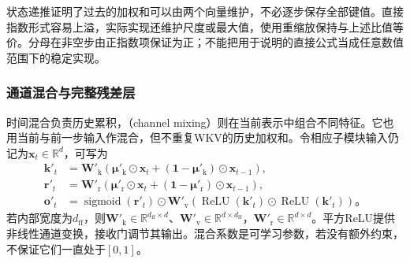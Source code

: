 状态递推证明了过去的加权和可以由两个向量维护，不必逐步保存全部键值。直接指数形式容易上溢，实际实现还维护尺度或最大值，使用重缩放保持与上述比值等价。分母在非空步由正指数项保证为正；不能把用于说明的直接公式当成任意数值范围下的稳定实现。

\subsubsection{通道混合与完整残差层}
\label{sec:rnn-rwkv-architecture}

时间混合负责历史累积，（channel mixing）则在当前表示中组合不同特征。它也用当前与前一步输入作混合，但不重复WKV的历史加权和。令相应子模块输入仍记为$\bm x_t\in\mathbb R^d$，可写为
\begin{equation}
  \begin{aligned}
    \bm k'_t&=\bm W'_{\mathrm k}\left(\bm\mu'_{\mathrm k}\odot\bm x_t
          +(\bm1-\bm\mu'_{\mathrm k})\odot\bm x_{t-1}\right),\\
    \bm r'_t&=\bm W'_{\mathrm r}\left(\bm\mu'_{\mathrm r}\odot\bm x_t
          +(\bm1-\bm\mu'_{\mathrm r})\odot\bm x_{t-1}\right),\\
    \bm o'_t&=\operatorname{sigmoid}(\bm r'_t)\odot
         \bm W'_{\mathrm v}\left(\operatorname{ReLU}(\bm k'_t)
                              \odot\operatorname{ReLU}(\bm k'_t)\right)\text{。}
  \end{aligned}
  \label{eq:rnn-rwkv-channel-mixing}
\end{equation}
若内部宽度为$d_{\mathrm{ff}}$，则$\bm W'_{\mathrm k}\in\mathbb R^{d_{\mathrm{ff}}\times d}$、$\bm W'_{\mathrm v}\in\mathbb R^{d\times d_{\mathrm{ff}}}$，$\bm W'_{\mathrm r}\in\mathbb R^{d\times d}$。平方ReLU提供非线性通道变换，接收门调节其输出。混合系数是可学习参数，若没有额外约束，不保证它们一直处于$[0,1]$。

